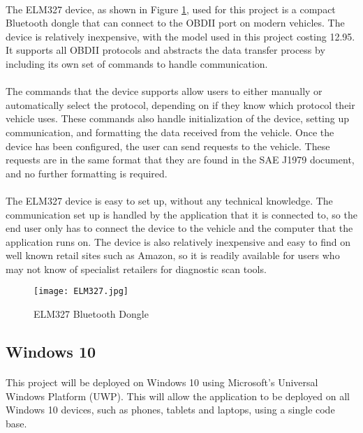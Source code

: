 		\paragraph{}{
		The ELM327 device, as shown in Figure \ref{fig:ELM327}, used for this project is a compact Bluetooth dongle that can connect to the OBDII port on modern vehicles. The device is relatively inexpensive, with the model used in this project costing {\textsterling}12.95. It supports all OBDII protocols and abstracts the data transfer process by including its own set of commands to handle communication.				
		}
		\paragraph{}{
		The commands that the device supports allow users to either manually or automatically select the protocol, depending on if they know which protocol their vehicle uses. These commands also handle initialization of the device, setting up communication, and formatting the data received from the vehicle. Once the device has been configured, the user can send requests to the vehicle. These requests are in the same format that they are found in the SAE J1979 document, and no further formatting is required.
		}
		\paragraph{}{
		The ELM327 device is easy to set up, without any technical knowledge. The communication set up is handled by the application that it is connected to, so the end user only has to connect the device to the vehicle and the computer that the application runs on. The device is also relatively inexpensive and easy to find on well known retail sites such as Amazon, so it is readily available for users who may not know of specialist retailers for diagnostic scan tools.
		}
		\begin{figure}[h]
				\begin{center}											
					\texttt{[image: ELM327.jpg]}
					\caption{ELM327 Bluetooth Dongle}
					\label{fig:ELM327}
				\end{center}
		\end{figure}		
\newpage
	\subsection{Windows 10}
		\paragraph{}{
		This project will be deployed on Windows 10 using Microsoft's Universal Windows Platform (UWP). This will allow the application to be deployed on all Windows 10 devices, such as phones, tablets and laptops, using a single code base.
		}
